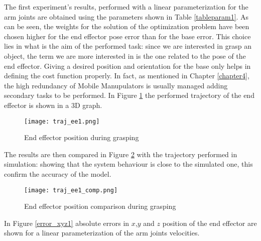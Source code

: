 The first experiment's results, performed with a linear parameterization for the arm joints are obtained using the parameters shown in Table \ref{tableparam1}. As can be seen, the weights for the solution of the optimization problem have been chosen higher for the end effector pose error than for the base error. This choice lies in what is the aim of the performed task: since we are interested in grasp an object, the term we are more interested in is the one related to the pose of the end effector. Giving a desired position and orientation for the base only helps in defining the cost function properly. In fact, as mentioned in Chapter \ref{chapter4}, the high redundancy of Mobile Manupulators is usually managed adding secondary tasks to be performed.
In Figure \ref{traj_ee1} the performed trajectory of the end effector is shown in a 3D graph. 
\begin{figure}[h!]
\centering
\texttt{[image: traj\_ee1.png]}
\caption{End effector position during grasping}
\label{traj_ee1}
\end{figure}
The results are then compared in Figure \ref{traj_ee1_comp} with the trajectory performed in simulation: showing that the system behaviour is close to the simulated one, this confirm the accuracy of the model. 
\begin{figure}[h!]
	\centering
	\texttt{[image: traj\_ee1\_comp.png]}
	\caption{End effector position comparison during grasping}
	\label{traj_ee1_comp}
\end{figure} 
In Figure \ref{error_xyz1} absolute errors in $x$,$y$ and $z$ position of the end effector are shown for a linear parameterization of the arm joints velocities.

